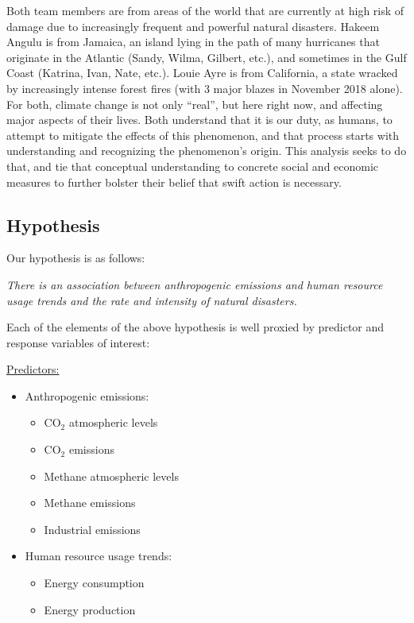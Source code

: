 \documentclass[10pt,]{article}
\begin{document}
Both team members are from areas of the world that are currently at high
risk of damage due to increasingly frequent and powerful natural
disasters. Hakeem Angulu is from Jamaica, an island lying in the path of
many hurricanes that originate in the Atlantic (Sandy, Wilma, Gilbert,
etc.), and sometimes in the Gulf Coast (Katrina, Ivan, Nate, etc.).
Louie Ayre is from California, a state wracked by increasingly intense
forest fires (with 3 major blazes in November 2018 alone). For both,
climate change is not only ``real'', but here right now, and affecting
major aspects of their lives. Both understand that it is our duty, as
humans, to attempt to mitigate the effects of this phenomenon, and that
process starts with understanding and recognizing the phenomenon's
origin. This analysis seeks to do that, and tie that conceptual
understanding to concrete social and economic measures to further
bolster their belief that swift action is necessary.

\newpage

\subsection{Hypothesis}\label{hypothesis}

Our hypothesis is as follows:

\textit{There is an association between anthropogenic emissions and human resource usage trends and the rate and intensity of natural disasters.}

Each of the elements of the above hypothesis is well proxied by
predictor and response variables of interest:

\underline{Predictors:}

\begin{itemize}
  \item Anthropogenic emissions:
  \begin{itemize}
    \item CO$_2$ atmospheric levels
    \item CO$_2$ emissions
    \item Methane atmospheric levels
    \item Methane emissions
    \item Industrial emissions
  \end{itemize}
  \item Human resource usage trends:
  \begin{itemize}
    \item Energy consumption
    \item Energy production
  \end{itemize}
\end{itemize}
\end{document}
